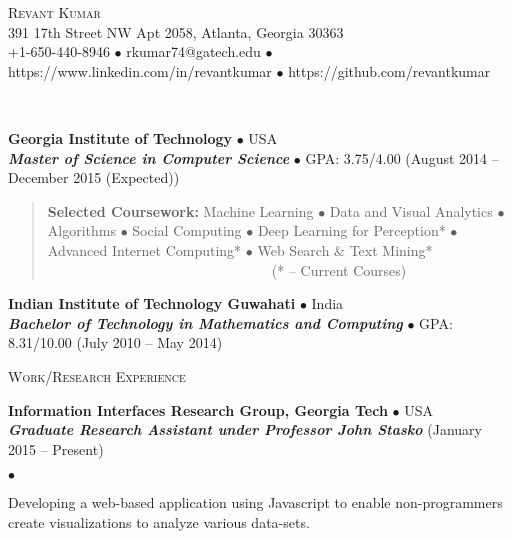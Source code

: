 \documentclass[10pt]{article}
\newcommand{\area}[2]{\begin{verse}\textbf{#1} #2 \end{verse}  }
\newcommand{\lineunder}{\\\vspace{-9pt}\hrulefill}
\newcommand{\header}[1]{{\normalsize\scshape{#1}} \lineunder}
\newcommand{\contact}[3]{\begin{center}{\huge\scshape{#1}}\\#2\\#3\end{center}}
\newenvironment{achievements}{\begin{list}{$\bullet$}{\topsep 0pt \itemsep 0pt}}{\end{list}}
\newcommand{\schoolWithCourses}[5]{
 \textbf{#1} $\bullet$ #2 \\
 \textbf{\emph{#3}} $\bullet$ #5 \hfill (#4) \\
}
\newcommand{\employer}[4]{ \textbf{#1} $\bullet$ #2 \\ \textbf{\emph{#4}} \hfill (#3)\\  }
\begin{document}
\small

\contact{Revant Kumar}
{391 17th Street NW Apt 2058, Atlanta, Georgia 30363}
{+1-650-440-8946 $\bullet$ rkumar74@gatech.edu $\bullet$ https://www.linkedin.com/in/revantkumar $\bullet$ https://github.com/revantkumar}

\vspace{2pt}

\vspace{-9pt}\header{Education}

\schoolWithCourses{Georgia Institute of Technology}{USA}{Master of Science in Computer Science}{August 2014 -- December 2015 (Expected)}{GPA: 3.75/4.00}
\vspace{-2pt}
\area{Selected Coursework:}{Machine Learning {\tiny$\bullet$} Data and Visual Analytics {\tiny$\bullet$} Algorithms {\tiny$\bullet$} Social Computing {\tiny$\bullet$}  Deep Learning for Perception* {\tiny$\bullet$}  Advanced Internet Computing* {\tiny$\bullet$} Web Search \& Text Mining* \ \ \ \ \ \ \ \ \ \ \ \ \ \ \ \ \ \ \ \ \ \ \ \ \ \ \ \ \ \ \ \ (* -- Current Courses)} %

\schoolWithCourses{Indian Institute of Technology Guwahati}{India}{Bachelor of Technology in Mathematics and Computing}{July 2010 -- May 2014}{GPA: 8.31/10.00}

\vspace{3pt}

\header{Work/Research Experience}


\employer{Information Interfaces Research Group, Georgia Tech}{USA}{January 2015 -- Present}{Graduate Research Assistant under Professor John Stasko}
	\begin{achievements}	
	\item Developing a web-based application using Javascript to enable non-programmers create visualizations to analyze various data-sets.
	\end{achievements}
\end{document}
